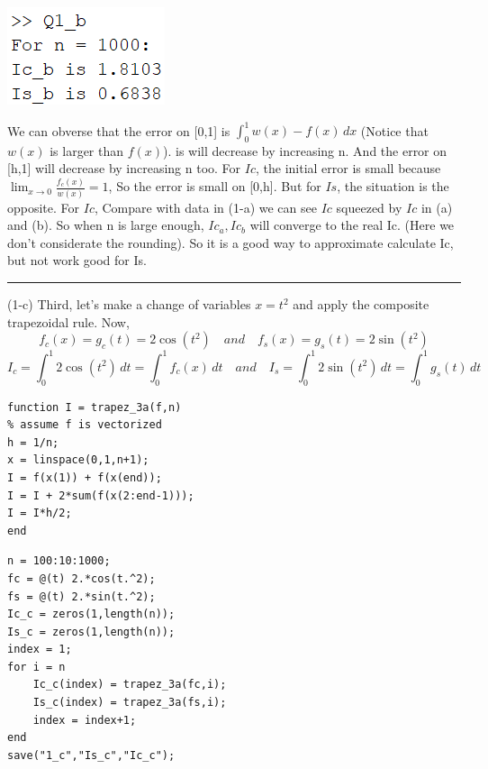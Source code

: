\documentclass{article}
\begin{document}
\begin{flushleft}
\begin{enumerate}
\begin{framed}
\begin{multicols}{2}
\begin{verbatim}
\end{verbatim}
\includegraphics[width={0.4\linewidth}]{Q1_b_sol.png}
\end{multicols}
We can obverse that the error on [0,1] is \(\int_{0}^{1} w(x) - f(x) \,dx\) (Notice that \(w(x)\) is larger than \(f(x)\)). is will decrease by increasing n.
And the error on [h,1] will decrease by increasing n too.
For \(Ic\), the initial error is small because \(\lim_{x \to 0} \frac{f_{c}(x)}{w(x)} = 1\), So the error is small on [0,h]. But for \(Is\), the situation is the opposite.
\newline
For \(Ic\), Compare with data in (1-a) we can see \(Ic\) squeezed by \(Ic\) in (a) and (b). So when n is large enough, \(Ic_{a}, Ic_{b}\) will converge to the real Ic. (Here we don't considerate the rounding).
\newline
So it is a good way to approximate calculate Ic, but not work good for Is.
\rule[-0.7mm]{45em}{0.5pt}
\newline
(1-c)
\newline
Third, let's make a change of variables \(x = t^{2}\) and apply the composite trapezoidal rule. Now,
\[
  f_{c}(x) = g_{c}(t)={2\cos(t^{2})}\quad and \quad f_{s}(x) = g_{s}(t) = {2\sin(t^{2})}
\]
\[
  I_{c} = \int_{0}^{1} 2\cos(t^{2}) \,dt = \int_{0}^{1} f_{c}(x) \,dt \quad and \quad I_{s} = \int_{0}^{1} 2\sin(t^{2}) \,dt = \int_{0}^{1} g_{s}(t) \,dt
\]
\begin{multicols}{2}
\begin{verbatim}
function I = trapez_3a(f,n)
% assume f is vectorized
h = 1/n;
x = linspace(0,1,n+1);
I = f(x(1)) + f(x(end));
I = I + 2*sum(f(x(2:end-1)));
I = I*h/2;
end
\end{verbatim}
\columnbreak
\begin{verbatim}
n = 100:10:1000;
fc = @(t) 2.*cos(t.^2);
fs = @(t) 2.*sin(t.^2);
Ic_c = zeros(1,length(n));
Is_c = zeros(1,length(n));
index = 1;
for i = n
    Ic_c(index) = trapez_3a(fc,i);
    Is_c(index) = trapez_3a(fs,i);
    index = index+1;
end
save("1_c","Is_c","Ic_c");
\end{verbatim}
\end{multicols}



\end{framed}
\end{enumerate}
\end{flushleft}
\end{document}
